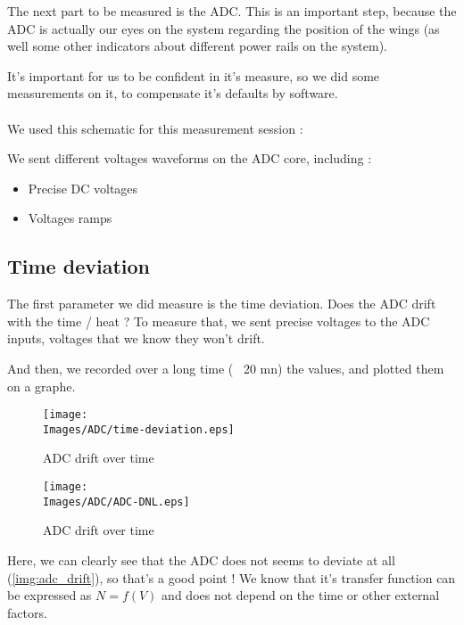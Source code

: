 The next part to be measured is the ADC. This is an important step, because the
ADC is actually our eyes on the system regarding the position of the wings (as
well some other indicators about different power rails on the system).

It's important for us to be confident in it's measure, so we did some
measurements on it, to compensate it's defaults by software.

\paragraph{}
We used this schematic for this measurement session :


We sent different voltages waveforms on the ADC core, including :

\begin{itemize}[noitemsep]
    \item Precise DC voltages
    \item Voltages ramps
\end{itemize}

\FloatBarrier
\subsection{Time deviation}
The first parameter we did measure is the time deviation. Does the ADC drift
with the time / heat ? To measure that, we sent precise voltages to the ADC
inputs, voltages that we know they won't drift.

And then, we recorded over a long time (~ 20 mn) the values, and plotted them
on a graphe.

\begin{figure}[!hbt]
    \centering
    \begin{minipage}[c]{0.48\textwidth}
        \centering
        \texttt{[image: \\Images/ADC/time-deviation.eps]}
        \caption{ADC drift over time}\label{img:adc_drift}
    \end{minipage}%
    \hfill%
    \begin{minipage}[c]{0.48\textwidth}
        \centering
        \texttt{[image: \\Images/ADC/ADC-DNL.eps]}
        \caption{ADC drift over time}\label{img:adc_dnl}
    \end{minipage}%
\end{figure}
\FloatBarrier

Here, we can clearly see that the ADC does not seems to deviate at all
(\ref{img:adc_drift}), so that's a good point ! We know that it's transfer
function can be expressed as $N = f(V)$ and does not depend on the time or
other external factors.

